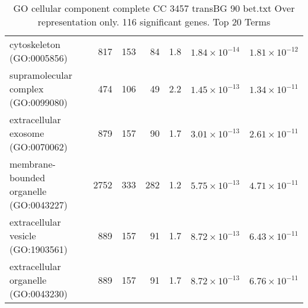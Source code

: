 \begin{table}[ht]
\begin{adjustbox}{width=\textwidth}
\begin{tabular}{lrrrrrr}
  cytoskeleton (GO:0005856) & 817 & 153 & 84 & 1.8 & $1.84 \times 10^{-14}$ & $1.81 \times 10^{-12}$ \\ 
  supramolecular complex (GO:0099080) & 474 & 106 & 49 & 2.2 & $1.45 \times 10^{-13}$ & $1.34 \times 10^{-11}$ \\ 
  extracellular exosome (GO:0070062) & 879 & 157 & 90 & 1.7 & $3.01 \times 10^{-13}$ & $2.61 \times 10^{-11}$ \\ 
  membrane-bounded organelle (GO:0043227) & 2752 & 333 & 282 & 1.2 & $5.75 \times 10^{-13}$ & $4.71 \times 10^{-11}$ \\ 
  extracellular vesicle (GO:1903561) & 889 & 157 & 91 & 1.7 & $8.72 \times 10^{-13}$ & $6.43 \times 10^{-11}$ \\ 
  extracellular organelle (GO:0043230) & 889 & 157 & 91 & 1.7 & $8.72 \times 10^{-13}$ & $6.76 \times 10^{-11}$ \\ 
   \hline
\end{tabular}
\end{adjustbox}
\caption{GO cellular component complete CC 3457 transBG 90 bet.txt Over representation only. 116 significant genes. Top 20 Terms} 
\label{tab:GO cellular component complete CC 3457 transBG 90 bet.txt Over representation only. 116 significant genes. Top 20 Terms}
\end{table}



